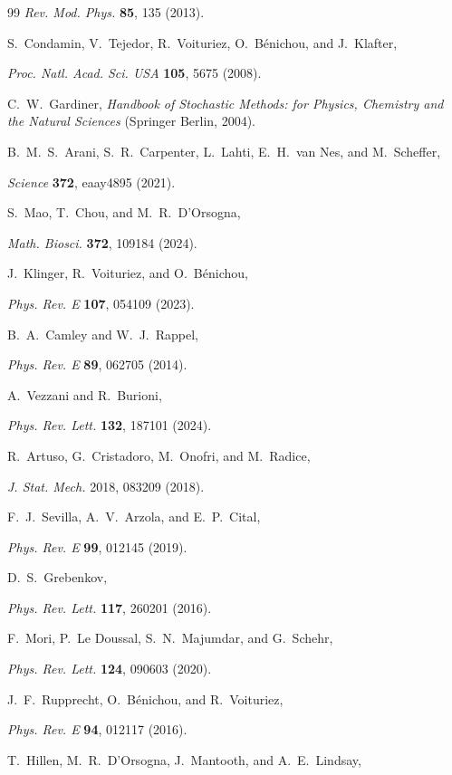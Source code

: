 \documentclass[
 reprint,










 amsmath,amssymb,
 aps, prl,






longbibliography
]{revtex4-2}
\begin{document}
\begin{thebibliography}{99}
\emph{Rev. Mod. Phys.} \textbf{85}, 135 (2013).

S.~Condamin, V.~Tejedor, R.~Voituriez, O.~Bénichou, and J.~Klafter,

\emph{Proc. Natl. Acad. Sci. USA} \textbf{105}, 5675 (2008).

C.~W.~Gardiner, \emph{Handbook of Stochastic Methods: for Physics, Chemistry and the Natural Sciences} (Springer Berlin, 2004).

B.~M.~S.~Arani, S.~R.~Carpenter, L.~Lahti, E.~H.~van Nes, and M.~Scheffer,

 \emph{Science} \textbf{372}, eaay4895 (2021).


S.~Mao, T.~Chou, and M.~R.~D’Orsogna,

 \emph{Math. Biosci.} \textbf{372}, 109184 (2024).


J.~Klinger, R.~Voituriez, and O.~Bénichou,

\emph{Phys. Rev. E} \textbf{107}, 054109 (2023).


B.~A.~Camley and W.~J.~Rappel,

\emph{Phys. Rev. E} \textbf{89}, 062705 (2014).

A.~Vezzani and R.~Burioni,

\emph{Phys. Rev. Lett.} \textbf{132}, 187101 (2024).

R.~Artuso, G.~Cristadoro, M.~Onofri, and M.~Radice,

 \emph{J. Stat. Mech.} 2018, 083209 (2018).

F.~J.~Sevilla, A.~V.~Arzola, and E.~P.~Cital,

 \emph{Phys. Rev. E} \textbf{99}, 012145 (2019).

D.~S.~Grebenkov,

 \emph{Phys. Rev. Lett.} \textbf{117}, 260201 (2016).

F.~Mori, P.~Le Doussal, S.~N.~Majumdar, and G.~Schehr,

\emph{Phys. Rev. Lett.} \textbf{124}, 090603 (2020).

J.~F.~Rupprecht, O.~Bénichou, and R.~Voituriez,

 \emph{Phys. Rev. E} \textbf{94}, 012117 (2016).

T.~Hillen, M.~R.~D'Orsogna, J.~Mantooth, and A.~E.~Lindsay,


\end{thebibliography}
\end{document}

